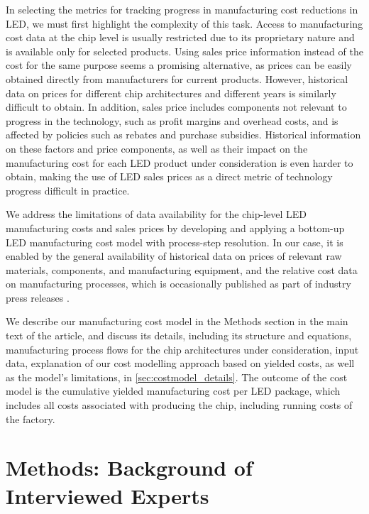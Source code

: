 \documentclass[parskip=full]{article}
\begin{document}
In selecting the metrics for tracking progress in manufacturing cost reductions in LED, we must first highlight the complexity of this task. Access to manufacturing cost data at the chip level is usually restricted due to its proprietary nature and is available only for selected products. Using sales price information instead of the cost for the same purpose seems a promising alternative, as prices can be easily obtained directly from manufacturers for current products. However, historical data on prices for different chip architectures and different years is similarly difficult to obtain. In addition, sales price includes components not relevant to progress in the technology, such as profit margins and overhead costs, and is affected by policies such as rebates and purchase subsidies. Historical information on these factors and price components, as well as their impact on the manufacturing cost for each LED product under consideration is even harder to obtain, making the use of LED sales prices as a direct metric of technology progress difficult in practice.

We address the limitations of data availability for the chip-level LED manufacturing costs and sales prices by developing and applying a bottom-up LED manufacturing cost model with process-step resolution. In our case, it is enabled by the general availability of historical data on prices of relevant raw materials, components, and manufacturing equipment, and the relative cost data on manufacturing processes, which is occasionally published as part of industry press releases \cite{ledinside2013csp}\cite{seoul2015csp}. 

We describe our manufacturing cost model in the Methods section in the main text of the article, and discuss its details, including its structure and equations, manufacturing process flows for the chip architectures under consideration, input data, explanation of our cost modelling approach based on yielded costs, as well as the model’s limitations, in \cref{sec:costmodel_details}. The outcome of the cost model is the cumulative yielded manufacturing cost per LED package, which includes all costs associated with producing the chip, including running costs of the factory.

\clearpage
\section{Methods: Background of Interviewed Experts}
\end{document}
